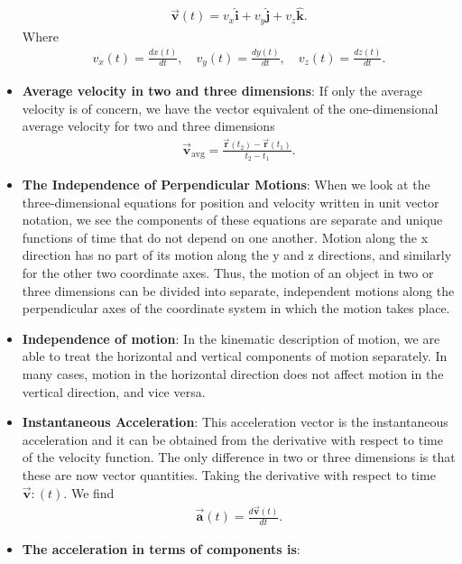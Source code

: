 \documentclass{report}
\begin{document}
\begin{itemize}
\begin{align*}
                \vec{\mathbf{v}}(t) = v_{x}\hat{\mathbf{i}} + v_{y}\hat{\mathbf{j}} + v_{z}\hat{\mathbf{k}}
            .\end{align*}
            Where 
            \begin{align*}
                v_{x}(t) = \frac{dx(t)}{dt}, \quad v_{y}(t) = \frac{dy(t)}{dt}, \quad v_{z}(t) = \frac{dz(t)}{dt}
            .\end{align*}
        \item \textbf{Average velocity in two and three dimensions}: 
            If only the average velocity is of concern, we have the vector equivalent of the one-dimensional average velocity for two and three dimensions
            \begin{align*}
                \vec{\mathbf{v}}_{\text{avg}} = \frac{\vec{\mathbf{r}}(t_{2})-\vec{\mathbf{r}}(t_{1})}{t_{2} - t_{1}}
            .\end{align*}
        \item \textbf{The Independence of Perpendicular Motions}: When we look at the three-dimensional equations for position and velocity written in unit vector notation, we see the components of these equations are separate and unique functions of time that do not depend on one another. Motion along the x direction has no part of its motion along the y and z directions, and similarly for the other two coordinate axes. Thus, the motion of an object in two or three dimensions can be divided into separate, independent motions along the perpendicular axes of the coordinate system in which the motion takes place.
        \item \textbf{Independence of motion}: In the kinematic description of motion, we are able to treat the horizontal and vertical components of motion separately. In many cases, motion in the horizontal direction does not affect motion in the vertical direction, and vice versa.
        \item \textbf{Instantaneous Acceleration}: This acceleration vector is the instantaneous acceleration and it can be obtained from the derivative with respect to time of the velocity function. The only difference in two or three dimensions is that these are now vector quantities. Taking the derivative with respect to time $\vec{\mathbf{v}}:(t) $. We find
            \begin{align*}
               \vec{\mathbf{a}}(t) = \frac{d\vec{\mathbf{v}}(t)}{dt} 
            .\end{align*}
        \item \textbf{The acceleration in terms of components is}:

\end{itemize}
\end{document}
